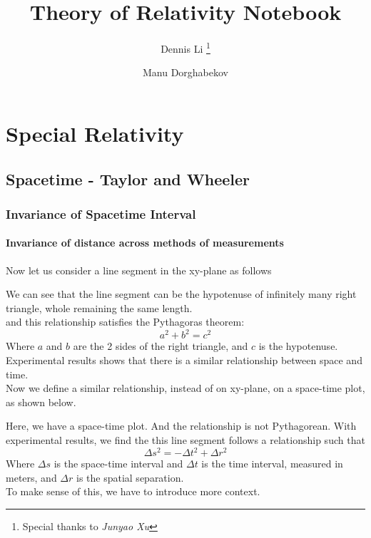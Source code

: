 \documentclass[12pt]{book}
\title{\textbf{Theory of Relativity Notebook}}
\author[$\dagger$]{
Dennis Li 
\thanks{Special thanks to \textit{Junyao Xu}}
}
\author[$\dagger$]{
Manu Dorghabekov 
}
\affil[$\dagger$]{Prof. Gabriel Perez-Giz}
\begin{document}
\maketitle
\tableofcontents
\part{Special Relativity}
\chapter{Spacetime - Taylor and Wheeler}
\section{Invariance of Spacetime Interval}

\subsection{Invariance of distance across methods of measurements}

Now let us consider a line segment in the xy-plane as follows
\begin{center}
\end{center}

We can see that the line segment can be the hypotenuse of infinitely many right triangle, whole remaining the same length.\\
and this relationship satisfies the Pythagoras theorem:
\[
a^2+b^2=c^2
\]
Where $a$ and $b$ are the 2 sides of the right triangle, and $c$ is the hypotenuse.\\
Experimental results shows that there is a similar relationship between space and time.\\
Now we define a similar relationship, instead of on xy-plane, on a space-time plot, as shown below. 
\begin{center}
\end{center}
Here, we have a space-time plot. And the relationship is not Pythagorean. With experimental results, we find the this line segment follows a relationship such that
\[
\Delta s^2=-\Delta t^2 + \Delta r^2
\]
Where $\Delta s$ is the space-time interval and $\Delta t$ is the time interval, measured in meters, and $\Delta r$ is the spatial separation.\\
To make sense of this, we have to introduce more context.
\end{document}
